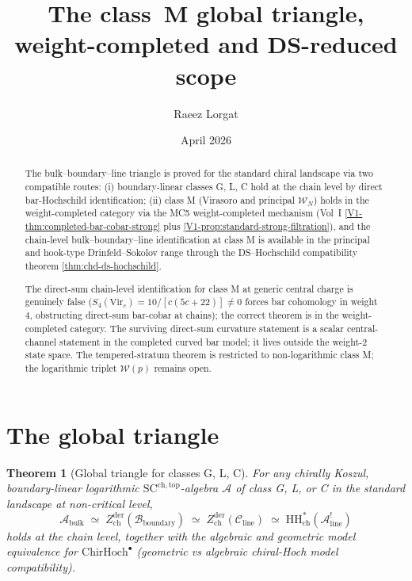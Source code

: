 \documentclass[11pt]{amsart}
\title{The class~M global triangle,\\
weight-completed and DS-reduced scope}
\author{Raeez Lorgat}
\date{April 2026}
\newtheorem{theorem}{Theorem}[section]
\theoremstyle{definition}
\theoremstyle{remark}
\providecommand{\ChirHoch}{\mathrm{ChirHoch}}
\providecommand{\Zder}{Z^{\mathrm{der}}_{\mathrm{ch}}}
\providecommand{\cA}{\mathcal{A}}
\providecommand{\cB}{\mathcal{B}}
\providecommand{\cC}{\mathcal{C}}
\providecommand{\cW}{\mathcal{W}}
\begin{document}
\maketitle

\begin{abstract}
The bulk--boundary--line triangle is proved for the standard chiral
landscape via two compatible routes: (i) boundary-linear classes
G, L, C hold at the chain level by direct bar-Hochschild
identification; (ii) class M (Virasoro and principal $\cW_N$)
holds in the weight-completed category via the MC5 weight-completed
mechanism
(Vol~I \ref*{V1-thm:completed-bar-cobar-strong} plus
\ref*{V1-prop:standard-strong-filtration}), and the chain-level
bulk--boundary--line identification at class M is available in the
principal and hook-type Drinfeld--Sokolov range through the
DS--Hochschild compatibility theorem \ref*{thm:chd-ds-hochschild}.

The direct-sum chain-level identification for class M at generic
central charge is genuinely false (\(S_4(\mathrm{Vir}_c) =
10/[c(5c+22)] \neq 0\) forces bar cohomology in weight~$4$,
obstructing direct-sum bar-cobar at chains); the correct theorem
is in the weight-completed category. The surviving direct-sum
curvature statement is a scalar central-channel statement in the
completed curved bar model; it lives outside the weight-$2$ state
space. The tempered-stratum theorem is restricted to
non-logarithmic class M; the
logarithmic triplet $\cW(p)$ remains open.
\end{abstract}

\section{The global triangle}
\label{sec:global-triangle-classM}

\begin{theorem}[Global triangle for classes G, L, C]%
\label{thm:triangle-GLC}%
For any chirally Koszul, boundary-linear logarithmic
$\mathrm{SC}^{\mathrm{ch,top}}$-algebra $\cA$ of class G, L, or C
in the standard landscape at non-critical level,
\[
  \cA_{\mathrm{bulk}}
  \;\simeq\;
  \Zder(\cB_{\mathrm{boundary}})
  \;\simeq\;
  \Zder(\cC_{\mathrm{line}})
  \;\simeq\;
  \mathrm{HH}^*_{\mathrm{ch}}(\cA^{!}_{\mathrm{line}})
\]
holds at the chain level, together with the algebraic and geometric
model equivalence for $\ChirHoch^\bullet$ (geometric vs algebraic chiral-Hoch model compatibility).
\end{theorem}
\end{document}
